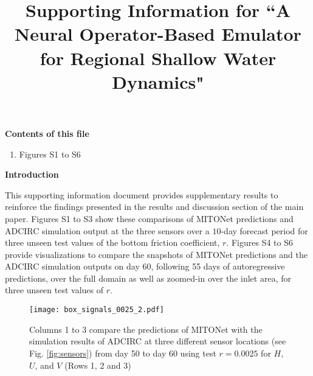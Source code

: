  \title{Supporting Information for ``A Neural Operator-Based Emulator for Regional Shallow Water Dynamics"}



\vspace{1cm}
\noindent\textbf{Contents of this file}

\begin{enumerate}
\item Figures S1 to S6

\end{enumerate}

\clearpage

\noindent\textbf{Introduction}

This supporting information document provides supplementary results to reinforce the findings presented in the results and discussion section of the main paper. Figures S1 to S3 show these comparisons of MITONet predictions and ADCIRC simulation output at the three sensors over a $10$-day forecast period for three unseen test values of the bottom friction coefficient, $r$. Figures S4 to S6 provide visualizations to compare the snapshots of MITONet predictions and the ADCIRC simulation outputs on day $60$, following 55 days of autoregressive predictions, over the full domain as well as zoomed-in over the inlet area, for three unseen test values of $r$. 

\clearpage

\begin{figure}
    \centering
    \texttt{[image: box\_signals\_0025\_2.pdf]}
    \caption{Columns 1 to 3 compare the predictions of MITONet with the simulation results of ADCIRC at three different sensor locations (see Fig. \ref{fig:sensors}) from day 50 to day 60 using test $r = 0.0025$ for $H$, $U$, and $V$ (Rows 1, 2 and 3)}
    \label{fig:box_signals1}
\end{figure}

